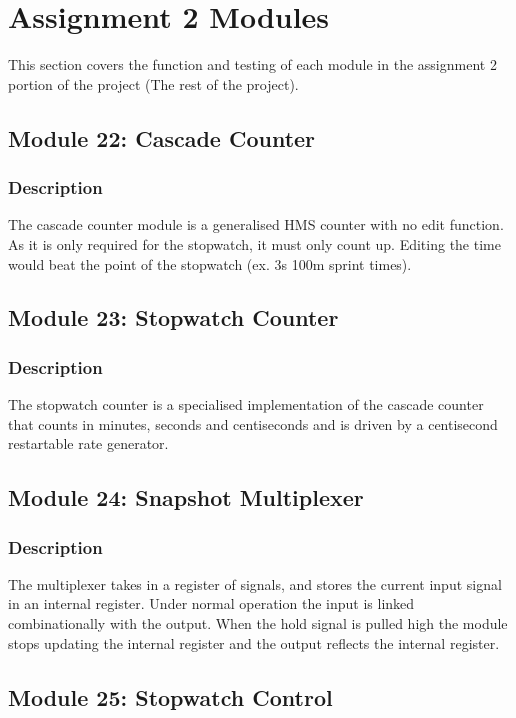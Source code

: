 \documentclass{report}
\begin{document}
\section{Assignment 2 Modules}
This section covers the function and testing of each module in 
the assignment 2 portion of the project (The rest of the project).
\pagebreak

\subsection{Module 22: Cascade Counter}
\subsubsection{Description}
The cascade counter module is a generalised HMS counter with no edit function. 
As it is only required for the stopwatch, it must only count up. Editing the 
time would beat the point of the stopwatch (ex. 3s 100m sprint times).

\subsection{Module 23: Stopwatch Counter}
\subsubsection{Description}
The stopwatch counter is a specialised implementation of the cascade counter 
that counts in minutes, seconds and centiseconds and is driven by a 
centisecond restartable rate generator.

\subsection{Module 24: Snapshot Multiplexer}
\subsubsection{Description}
The multiplexer takes in a register of signals, and stores the current input 
signal in an internal register. Under normal operation the input is linked
combinationally with the output. When the hold signal is pulled high the 
module stops updating the internal register and the output reflects the internal
register.

\subsection{Module 25: Stopwatch Control}
\end{document}
